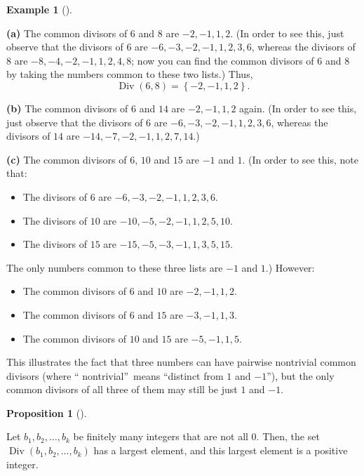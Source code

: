 \documentclass[numbers=enddot,12pt,final,onecolumn,notitlepage]{scrartcl}%
\numberwithin{exer}{subsection}
\theoremstyle{definition}
\newtheorem{prop}[theo]{Proposition}
\newenvironment{proposition}[1][]
{\begin{prop}[#1]\begin{leftbar}}
{\end{leftbar}\end{prop}}
\newtheorem{exam}[theo]{Example}
\newenvironment{example}[1][]
{\begin{exam}[#1]\begin{leftbar}}
{\end{leftbar}\end{exam}}
\begin{document}
\begin{example}
\textbf{(a)} The common divisors of $6$ and $8$ are $-2,-1,1,2$. (In order to
see this, just observe that the divisors of $6$ are $-6,-3,-2,-1,1,2,3,6$,
whereas the divisors of $8$ are $-8,-4,-2,-1,1,2,4,8$; now you can find the
common divisors of $6$ and $8$ by taking the numbers common to these two
lists.) Thus,%
\[
\operatorname*{Div}\left(  6,8\right)  =\left\{  -2,-1,1,2\right\}  .
\]


\textbf{(b)} The common divisors of $6$ and $14$ are $-2,-1,1,2$ again. (In
order to see this, just observe that the divisors of $6$ are
$-6,-3,-2,-1,1,2,3,6$, whereas the divisors of $14$ are
$-14,-7,-2,-1,1,2,7,14$.)

\textbf{(c)} The common divisors of $6$, $10$ and $15$ are $-1$ and $1$. (In
order to see this, note that:

\begin{itemize}
\item The divisors of $6$ are $-6,-3,-2,-1,1,2,3,6$.

\item The divisors of $10$ are $-10,-5,-2,-1,1,2,5,10$.

\item The divisors of $15$ are $-15,-5,-3,-1,1,3,5,15$.
\end{itemize}

\noindent The only numbers common to these three lists are $-1$ and $1$.) However:

\begin{itemize}
\item The common divisors of $6$ and $10$ are $-2,-1,1,2$.

\item The common divisors of $6$ and $15$ are $-3,-1,1,3$.

\item The common divisors of $10$ and $15$ are $-5,-1,1,5$.
\end{itemize}

\noindent This illustrates the fact that three numbers can have pairwise
nontrivial common divisors (where \textquotedblleft
nontrivial\textquotedblright\ means \textquotedblleft distinct from $1$ and
$-1$\textquotedblright), but the only common divisors of all three of them may
still be just $1$ and $-1$.
\end{example}

\begin{proposition}
\label{prop.ent.Div.fin}Let $b_{1},b_{2},\ldots,b_{k}$ be finitely many
integers that are not all $0$. Then, the set $\operatorname*{Div}\left(
b_{1},b_{2},\ldots,b_{k}\right)  $ has a largest element, and this largest
element is a positive integer.
\end{proposition}
\end{document}
